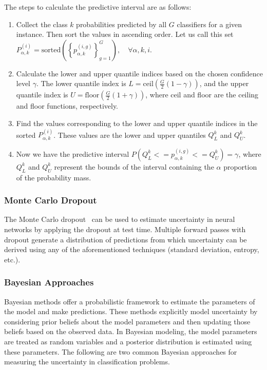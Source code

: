 The steps to calculate the predictive interval are as follows:

\begin{enumerate}
    \item Collect the class $k $ probabilities predicted by all $G$ classifiers for a given instance. Then sort the values in ascending order. Let us call this set $P_{\alpha,k}^{(i)}=\mathrm{sorted}\left(\left\{p_{\alpha,k}^{(i,g)}\right\}_{g=1}^G\right),\quad\forall \alpha,k,i $.

    \item Calculate the lower and upper quantile indices based on the chosen confidence level $\gamma $. The lower quantile index is $L=\mathrm{ceil}\left(\frac{G}{2}\left(1-\gamma\right)\right) $, and the upper quantile index is $U=\mathrm{floor}\left(\frac{G}{2} (1+\gamma)\right) $, where ceil and floor are the ceiling and floor functions, respectively.

    \item Find the values corresponding to the lower and upper quantile indices in the sorted $P_{\alpha,k}^{(i)} $. These values are the lower and upper quantiles $Q_L^{k} $ and $Q_U^{k} $.

    \item Now we have the predictive interval $P\left(Q_L^{k}<=p_{\alpha,k}^{(i,g)}<=Q_U^{k}\right)=\gamma $, where $Q_L^{k} $ and $Q_U^{k} $ represent the bounds of the interval containing the $\alpha$ proportion of the probability mass.
\end{enumerate}

\subsubsection{Monte Carlo Dropout}
The Monte Carlo dropout~\cite{gal_Dropout_2016a} can be used to estimate uncertainty in neural networks by applying the dropout at test time. Multiple forward passes with dropout generate a distribution of predictions from which uncertainty can be derived using any of the aforementioned techniques (standard deviation, entropy, etc.).

\subsubsection{Bayesian Approaches}
Bayesian methods offer a probabilistic framework to estimate the parameters of the model and make predictions. These methods explicitly model uncertainty by considering prior beliefs about the model parameters and then updating those beliefs based on the observed data. In Bayesian modeling, the model parameters are treated as random variables and a posterior distribution is estimated using these parameters. The following are two common Bayesian approaches for measuring the uncertainty in classification problems.

